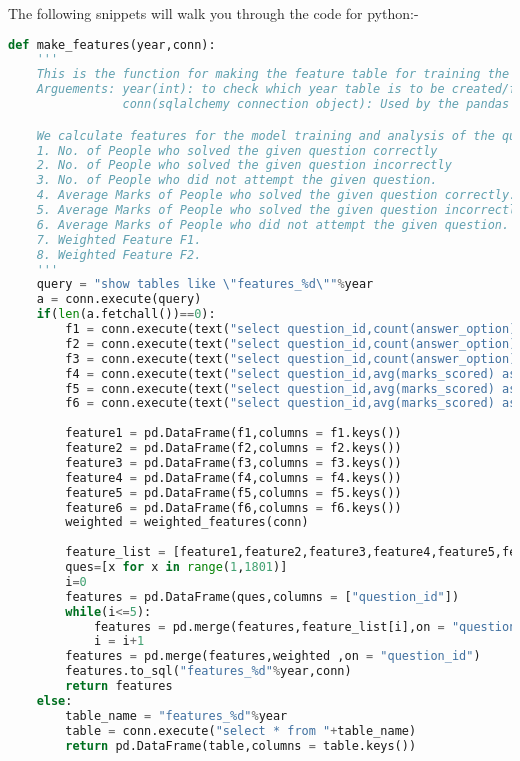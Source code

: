\documentclass[a4paper,12pt,oneside]{book}
\begin{document}
The following snippets will walk you through the code for python:-
\begin{lstlisting}[language=Python, caption= Making Features]
def make_features(year,conn):
    '''
    This is the function for making the feature table for training the model
    Arguements: year(int): to check which year table is to be created/fetched
                conn(sqlalchemy connection object): Used by the pandas to fetch data from the database

    We calculate features for the model training and analysis of the questions such as :
    1. No. of People who solved the given question correctly
    2. No. of People who solved the given question incorrectly
    3. No. of People who did not attempt the given question.
    4. Average Marks of People who solved the given question correctly.
    5. Average Marks of People who solved the given question incorrectly.
    6. Average Marks of People who did not attempt the given question.
    7. Weighted Feature F1.
    8. Weighted Feature F2.
    '''
    query = "show tables like \"features_%d\""%year
    a = conn.execute(query)
    if(len(a.fetchall())==0):
        f1 = conn.execute(text("select question_id,count(answer_option) as correctly_answered from for_features where marks = 3 and marked =1 group by question_id"))
        f2 = conn.execute(text("select question_id,count(answer_option) as incorrectly_answered from for_features where marks = -1 and marked =1 group by question_id"))
        f3 = conn.execute(text("select question_id,count(answer_option) as not_answered from for_features where marked =0 group by question_id"))
        f4 = conn.execute(text("select question_id,avg(marks_scored) as avg_marks_correct from for_features where marks = 3 and marked =1 group by question_id"))
        f5 = conn.execute(text("select question_id,avg(marks_scored) as avg_marks_incorrect from for_features where marks = -1 and marked =1 group by question_id"))
        f6 = conn.execute(text("select question_id,avg(marks_scored) as avg_marks_na from for_features where marked =0 group by question_id"))
    
        feature1 = pd.DataFrame(f1,columns = f1.keys())
        feature2 = pd.DataFrame(f2,columns = f2.keys())
        feature3 = pd.DataFrame(f3,columns = f3.keys())
        feature4 = pd.DataFrame(f4,columns = f4.keys())
        feature5 = pd.DataFrame(f5,columns = f5.keys())
        feature6 = pd.DataFrame(f6,columns = f6.keys())
        weighted = weighted_features(conn)
    
        feature_list = [feature1,feature2,feature3,feature4,feature5,feature6]
        ques=[x for x in range(1,1801)]
        i=0
        features = pd.DataFrame(ques,columns = ["question_id"])
        while(i<=5):
            features = pd.merge(features,feature_list[i],on = "question_id")
            i = i+1
        features = pd.merge(features,weighted ,on = "question_id")
        features.to_sql("features_%d"%year,conn)
        return features
    else:
        table_name = "features_%d"%year
        table = conn.execute("select * from "+table_name)
        return pd.DataFrame(table,columns = table.keys())
\end{lstlisting}
\end{document}
